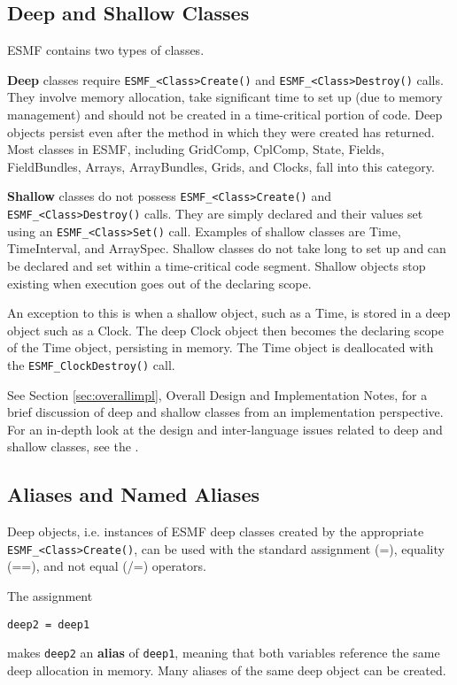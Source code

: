 \subsection{Deep and Shallow Classes}
\label{sec:deepshallow}

ESMF contains two types of classes.

{\bf Deep} classes require
{\tt ESMF\_<Class>Create()} and {\tt ESMF\_<Class>Destroy()} calls.
They involve memory allocation, take significant time to set up (due to
memory management) and should not be created in a time-critical portion of code.
Deep objects persist even after the method in which they were created has
returned. Most classes in ESMF, including GridComp, CplComp, State, Fields,
FieldBundles, Arrays, ArrayBundles, Grids, and Clocks, fall into this category.

{\bf Shallow} classes do not possess {\tt ESMF\_<Class>Create()}
and {\tt ESMF\_<Class>Destroy()} calls.  They are simply declared
and their values set using an {\tt ESMF\_<Class>Set()} call.  
Examples of shallow classes are Time, TimeInterval, and ArraySpec.
Shallow classes do not take long to set up and can be declared and set within
a time-critical code segment.  Shallow objects stop existing when execution
goes out of the declaring scope.

An exception to this is when a shallow object, such as a Time, 
is stored in a deep object such as a Clock.  The deep Clock object then
becomes the declaring scope of the Time object, persisting in memory.
The Time object is deallocated with the {\tt ESMF\_ClockDestroy()} call.

See Section \ref{sec:overallimpl}, Overall Design and Implementation 
Notes, for a brief discussion of deep and shallow classes from 
an implementation perspective.  For an in-depth look at the design 
and inter-language issues related to deep and shallow classes,
see the .

\subsection{Aliases and Named Aliases}
\label{sec:aliases}

Deep objects, i.e. instances of ESMF deep classes created by the appropriate
{\tt ESMF\_<Class>Create()}, can be used with the standard assignment (=),
equality (==), and not equal (/=) operators.

The assignment
\begin{verbatim}
deep2 = deep1
\end{verbatim}
makes {\tt deep2} an {\bf alias} of {\tt deep1}, meaning that both variables
reference the same deep allocation in memory. Many aliases of the same deep
object can be created.

